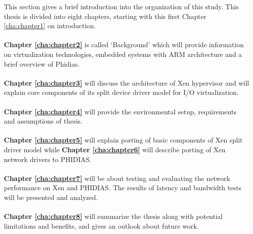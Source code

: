 This section gives a brief introduction into the organization of this study. This thesis is divided into eight chapters, starting with this first Chapter \ref{cha:chapter1} on introduction. 
\\
\\
\textbf{Chapter \ref{cha:chapter2}} is called `Background' which will provide information on virtualization technologies, embedded systems with ARM architecture and a brief overview of Phidias.
\\
\\
\textbf{Chapter \ref{cha:chapter3}} will discuss the architecture of Xen hypervisor and will explain core components of its split device driver model for I/O virtualization.
\\
\\
\textbf{Chapter \ref{cha:chapter4}} will provide the environmental setup, requirements and assumptions of thesis.
\\
\\
\textbf{Chapter \ref{cha:chapter5}} will explain porting of basic components of Xen split driver model while  \textbf{Chapter \ref{cha:chapter6}} will describe porting of Xen network drivers to PHIDIAS.
\\
\\
\textbf{Chapter \ref{cha:chapter7}} will be about testing and evaluating the network performance on Xen and PHIDIAS. The results of latency and bandwidth tests will be presented and analyzed.
\\
\\
\textbf{Chapter \ref{cha:chapter8}} will summarize the thesis along with potential limitations and benefits, and gives an outlook about future work.
